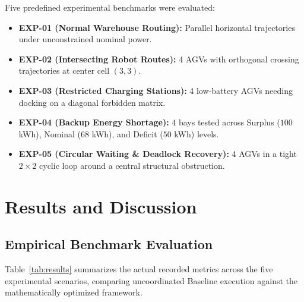 \documentclass[conference]{IEEEtran}
\begin{document}
Five predefined experimental benchmarks were evaluated:
\begin{itemize}
    \item \textbf{EXP-01 (Normal Warehouse Routing):} Parallel horizontal trajectories under unconstrained nominal power.
    \item \textbf{EXP-02 (Intersecting Robot Routes):} 4 AGVs with orthogonal crossing trajectories at center cell $(3, 3)$.
    \item \textbf{EXP-03 (Restricted Charging Stations):} 4 low-battery AGVs needing docking on a diagonal forbidden matrix.
    \item \textbf{EXP-04 (Backup Energy Shortage):} 4 bays tested across Surplus ($100$ kWh), Nominal ($68$ kWh), and Deficit ($50$ kWh) levels.
    \item \textbf{EXP-05 (Circular Waiting \& Deadlock Recovery):} 4 AGVs in a tight $2 \times 2$ cyclic loop around a central structural obstruction.
\end{itemize}

\section{Results and Discussion}

\subsection{Empirical Benchmark Evaluation}
Table~\ref{tab:results} summarizes the actual recorded metrics across the five experimental scenarios, comparing uncoordinated Baseline execution against the mathematically optimized framework.
\end{document}
